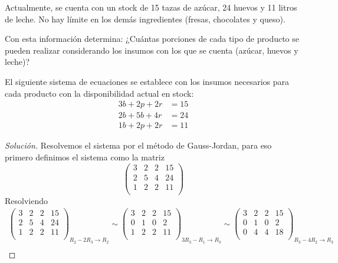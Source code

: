 \documentclass[12pt]{article}
\newenvironment{solution}{\begin{proof}[Solución]}{\end{proof}}
\begin{document}
\begin{enumerate}
    Actualmente, se cuenta con un stock de 15 tazas de azúcar, 24 huevos y 11 litros de leche. No hay límite en los demás ingredientes (fresas, chocolates y queso).

    Con esta información determina: ¿Cuántas porciones de cada tipo de producto se pueden realizar considerando los insumos con los que se cuenta (azúcar, huevos y leche)?

    El siguiente sistema de ecuaciones se establece con los insumos necesarios para cada producto con la disponibilidad actual en stock:
    \begin{align*}
        3b + 2p +2r &= 15 \\
        2b + 5b + 4r &= 24 \\
        1b + 2p +2r &= 11
    \end{align*}
    \begin{solution}
        Resolvemos el sistema por el método de Gauss-Jordan, para eso primero definimos el sistema como la matriz \[\left(\begin{array}{ccc|c}  
            3 & 2 & 2 & 15 \\  
            2 & 5 & 4 & 24  \\
            1 & 2 & 2 & 11 \\ 
        \end{array}\right)\]
        Resolviendo \begin{gather*}
            \left(\begin{array}{ccc|c}  
                3 & 2 & 2 & 15 \\  
                2 & 5 & 4 & 24  \\
                1 & 2 & 2 & 11 \\ 
            \end{array}\right)_{R_2-2R_3 \rightarrow R_2} \sim \left(\begin{array}{ccc|c}  
                3 & 2 & 2 & 15 \\  
                0 & 1 & 0 & 2  \\
                1 & 2 & 2 & 11 \\ 
            \end{array}\right)_{3R_3-R_1 \rightarrow R_3} \sim \left(\begin{array}{ccc|c}  
                3 & 2 & 2 & 15 \\  
                0 & 1 & 0 & 2  \\
                0 & 4 & 4 & 18 \\ 
            \end{array}\right)_{R_3-4R_2 \rightarrow R_3} \\

\end{gather*}
\end{solution}
\end{enumerate}
\end{document}
